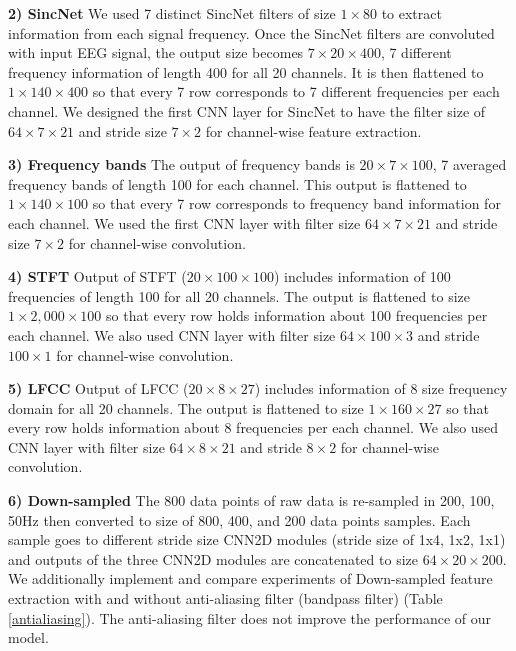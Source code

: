 \documentclass[pmlr,twocolumn,10pt]{jmlr}
\begin{document}
\noindent\textbf{2) SincNet}
We used 7 distinct SincNet filters of size $1 \times 80$ to extract information from each signal frequency. Once the SincNet filters are convoluted with input EEG signal, the output size becomes $7 \times 20 \times 400$, 7 different frequency information of length 400 for all 20 channels. It is then flattened to $1 \times 140 \times 400$ so that every 7 row corresponds to 7 different frequencies per each channel. 
We designed the first CNN layer for SincNet to have the filter size of $64 \times 7 \times 21$ and stride size $7 \times 2$ for channel-wise feature extraction.

\noindent\textbf{3) Frequency bands}
The output of frequency bands is $20 \times 7 \times 100$, 7 averaged frequency bands of length 100 for each channel. This output is flattened to $1 \times 140 \times 100$ so that every 7 row corresponds to frequency band information for each channel. We used the first CNN layer with filter size $64 \times 7 \times 21$ and stride size $7 \times 2$ for channel-wise convolution.

\noindent\textbf{4) STFT}
Output of STFT ($20 \times 100 \times 100$) includes information of 100 frequencies of length 100 for all 20 channels. The output is flattened to size $1 \times 2,000 \times 100$ so that every row holds information about 100 frequencies per each channel. We also used CNN layer with filter size $64 \times 100 \times 3$ and stride $100 \times 1$ for channel-wise convolution.

\noindent\textbf{5) LFCC}
Output of LFCC ($20 \times 8 \times 27$) includes information of 8 size frequency domain for all 20 channels. The output is flattened to size $1 \times 160 \times 27$ so that every row holds information about 8 frequencies per each channel. We also used CNN layer with filter size $64 \times 8 \times 21$ and stride $8 \times 2$ for channel-wise convolution.

\noindent\textbf{6) Down-sampled}
The 800 data points of raw data is re-sampled in 200, 100, 50Hz then converted to size of 800, 400, and 200 data points samples. Each sample goes to different stride size CNN2D modules (stride size of 1x4, 1x2, 1x1) and outputs of the three CNN2D modules are concatenated to size $64 \times 20 \times 200$. We additionally implement and compare experiments of Down-sampled feature extraction with and without anti-aliasing filter (bandpass filter) (Table \ref{antialiasing}). The anti-aliasing filter does not improve the performance of our model.
\end{document}
